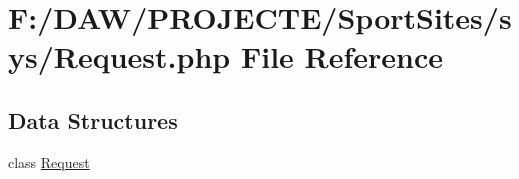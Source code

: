 \hypertarget{_request_8php}{}\section{F\+:/\+D\+A\+W/\+P\+R\+O\+J\+E\+C\+T\+E/\+Sport\+Sites/sys/\+Request.php File Reference}
\label{_request_8php}
\subsection*{Data Structures}
\begin{DoxyCompactItemize}
\item 
class \hyperlink{class_request}{Request}
\end{DoxyCompactItemize}

